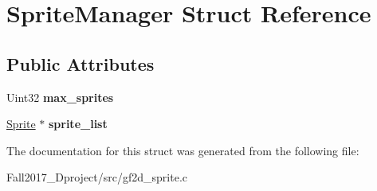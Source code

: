 \hypertarget{struct_sprite_manager}{}\section{Sprite\+Manager Struct Reference}
\label{struct_sprite_manager}
\subsection*{Public Attributes}
\begin{DoxyCompactItemize}
\item 
\mbox{\label{struct_sprite_manager_a88f9ad69988626932d133a946a56b5b9}} 
Uint32 {\bfseries max\+\_\+sprites}
\item 
\mbox{\label{struct_sprite_manager_ac720432564f9bb3c1e42a6d4fa93241e}} 
\hyperlink{struct_sprite___s}{Sprite} $\ast$ {\bfseries sprite\+\_\+list}
\end{DoxyCompactItemize}


The documentation for this struct was generated from the following file\+:\begin{DoxyCompactItemize}
\item 
Fall2017\+\_\+Dproject/src/gf2d\+\_\+sprite.\+c\end{DoxyCompactItemize}
